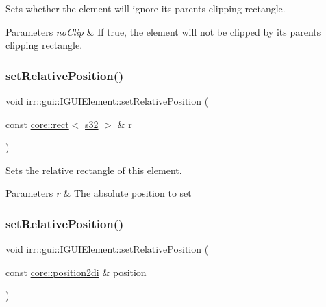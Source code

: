 Sets whether the element will ignore its parent\textquotesingle{}s clipping rectangle. 


\begin{DoxyParams}{Parameters}
{\em no\+Clip} & If true, the element will not be clipped by its parent\textquotesingle{}s clipping rectangle. \\
\hline
\end{DoxyParams}
\mbox{\label{classirr_1_1gui_1_1IGUIElement_a0e5bb2d0a2e88e30d3697652f8dd7034}} 
\subsubsection{\texorpdfstring{set\+Relative\+Position()}{setRelativePosition()}\hspace{0.1cm}{\footnotesize\ttfamily [1/2]}}
{\footnotesize\ttfamily void irr\+::gui\+::\+I\+G\+U\+I\+Element\+::set\+Relative\+Position (\begin{DoxyParamCaption}\item[{const \hyperlink{classirr_1_1core_1_1rect}{core\+::rect}$<$ \hyperlink{namespaceirr_ac66849b7a6ed16e30ebede579f9b47c6}{s32} $>$ \&}]{r }\end{DoxyParamCaption})\hspace{0.3cm}{\ttfamily [inline]}}



Sets the relative rectangle of this element. 


\begin{DoxyParams}{Parameters}
{\em r} & The absolute position to set \\
\hline
\end{DoxyParams}
\mbox{\label{classirr_1_1gui_1_1IGUIElement_aba1cfc75daa28e53a021faa2d954b79b}} 
\subsubsection{\texorpdfstring{set\+Relative\+Position()}{setRelativePosition()}\hspace{0.1cm}{\footnotesize\ttfamily [2/2]}}
{\footnotesize\ttfamily void irr\+::gui\+::\+I\+G\+U\+I\+Element\+::set\+Relative\+Position (\begin{DoxyParamCaption}\item[{const \hyperlink{namespaceirr_1_1core_a3643c2cc7820dd78cd87e73a46b92145}{core\+::position2di} \&}]{position }\end{DoxyParamCaption})\hspace{0.3cm}{\ttfamily [inline]}}



